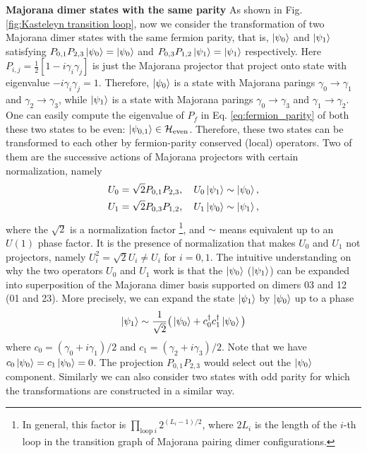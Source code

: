 \documentclass[%
 reprint,
 amsmath,amssymb,
 aps,
prb,
]{revtex4-2}
\begin{document}
\textbf{Majorana dimer states with the same parity} 
As shown in Fig. \ref{fig:Kasteleyn transition loop}, now we consider the transformation of two Majorana dimer states with the same fermion parity, that is, $\ket{\psi_0}$ and $\ket{\psi_1}$ satisfying $P_{0,1} P_{2,3} \ket{\psi_0} = \ket{\psi_0}$ and $P_{0,3} P_{1,2} \ket{\psi_1} = \ket{\psi_1}$ respectively. 
Here $P_{i,j} = \frac{1}{2}\left[ 1- i\gamma _{i} \gamma _{j}\right]$ is just the Majorana projector that project onto state with eigenvalue $-i\gamma_i\gamma_j=1$.
Therefore, $\ket{\psi_0}$ is a state with Majorana parings $\gamma_0 \rightarrow \gamma_1$ and $\gamma_2 \rightarrow \gamma_3$, while $\ket{\psi_1}$ is a state with Majorana parings $\gamma_0 \rightarrow \gamma_3$ and $\gamma_1 \rightarrow \gamma_2$.
One can easily compute the eigenvalue of $P_f$ in Eq. \eqref{eq:fermion_parity} of both these two states to be even: $\ket{\psi_{0,1}} \in \mathcal{H}_{\text{even}}$.
Therefore, these two states can be transformed to each other by fermion-parity conserved (local) operators. Two of them are the  successive actions of Majorana projectors with certain normalization, namely
\begin{align}
U_0=\sqrt{2} P_{0,1} P_{2,3},\quad U_0 \ket{\psi_1} \sim \ket{\psi_0} ,\\
U_1=\sqrt{2} P_{0,3} P_{1,2}, \quad U_1 \ket{\psi_0} \sim \ket{\psi_1} ,
\end{align}
where the $\sqrt{2}$ is a normalization factor 
\footnote{In general, this factor is $\prod_{\mathrm{loop} \ i} 2^{(L_i - 1)/2}$, where $2L_i$ is the length of the $i$-th loop in the transition graph of Majorana pairing dimer configurations.},
and $\sim$ means equivalent up to an $U(1)$ phase factor. 
It is the presence of normalization that makes $U_0$ and $U_1$ not projectors, namely $U_i^2=\sqrt{2} U_i\neq U_i$ for $i=0,1$.
The intuitive understanding on why the two operators $U_0$ and $U_1$ work is that the $\ket{\psi_0}$ ($\ket{\psi_1}$) can be expanded into superposition of the Majorana dimer basis supported on dimers 03 and 12 (01 and 23).
More precisely, we can expand the state $\ket{\psi_1}$ by $\ket{\psi_0}$ up to a phase
\begin{align}
\ket{\psi_1} \sim \frac{1}{\sqrt{2}}\big(\ket{\psi_0}+c_0^\dagger c_1^\dagger \ket{\psi_0}\big)
\end{align}
where $c_0={(\gamma_0+i\gamma_1)}/{2}$ and $c_1={(\gamma_2+i\gamma_3)}/{2}$.
Note that we have $c_0\ket{\psi_0}=c_1\ket{\psi_0}=0$. 
The projection $P_{0,1}P_{2,3}$ would select out the $\ket{\psi_0}$ component. 
Similarly we can also consider two states with odd parity for which the transformations are constructed in a similar way.
\end{document}
